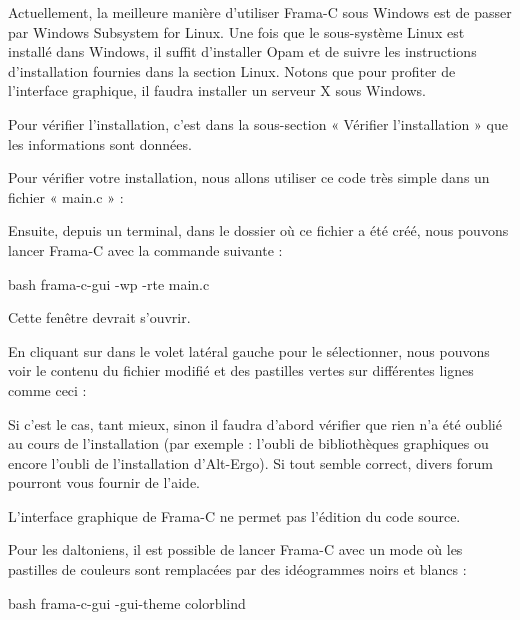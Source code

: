 Actuellement, la meilleure manière d'utiliser Frama-C sous Windows
est de passer par Windows Subsystem for Linux. Une fois que le sous-système
Linux est installé dans Windows, il suffit d'installer Opam et de suivre les
instructions d'installation fournies dans la section Linux. Notons que pour
profiter de l'interface graphique, il faudra installer un serveur X sous
Windows.


Pour vérifier l'installation, c'est dans la sous-section « Vérifier l'installation »
que les informations sont données.




Pour vérifier votre installation, nous allons utiliser ce code très simple dans un
fichier « main.c » :




Ensuite, depuis un terminal, dans le dossier où ce fichier a été créé,
nous pouvons lancer Frama-C avec la commande suivante :



\begin{CodeBlock}{bash}
frama-c-gui -wp -rte main.c
\end{CodeBlock}



Cette fenêtre devrait s'ouvrir.





En cliquant sur  dans le volet latéral gauche pour le sélectionner,
nous pouvons voir le contenu du fichier  modifié et des pastilles
vertes sur différentes lignes comme ceci :





Si c'est le cas, tant mieux, sinon il faudra d'abord vérifier que rien n'a été
oublié au cours de l'installation (par exemple : l'oubli de bibliothèques graphiques
ou encore l'oubli de l'installation d'Alt-Ergo). Si tout semble correct, divers forum
pourront vous fournir de l'aide.



\begin{Warning}
L'interface graphique de Frama-C ne permet pas l'édition du code source.
\end{Warning}


\begin{Information}
Pour les daltoniens, il est possible de lancer Frama-C avec un mode où les
pastilles de couleurs sont remplacées par des idéogrammes noirs et blancs :

\begin{CodeBlock}{bash}
frama-c-gui -gui-theme colorblind
\end{CodeBlock}
\end{Information}



